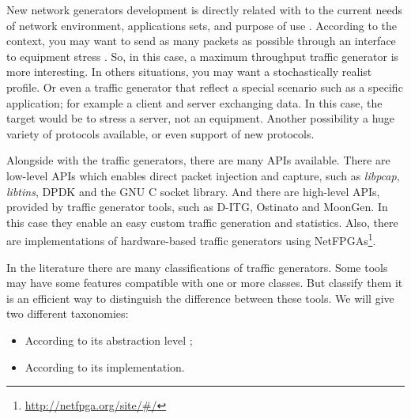 
New network generators development is directly related with to the current needs of network environment, applications sets, and purpose of use \cite{validate-trafficgen}. According to the context, you may want to send as many packets as possible through an interface to  equipment stress . So, in this case, a maximum throughput traffic generator is more interesting. In others situations, you may want a stochastically realist profile. Or even a traffic generator that reflect a special scenario such as a specific application; for example a client and server exchanging data\cite{surge-paper}. In this case, the target would be to stress a server, not an equipment. Another possibility a huge variety of protocols available, or even support of new protocols.

Alongside with the traffic generators, there are many APIs available. There are low-level APIs which enables direct packet injection and capture, such as \textit{libpcap}\cite{web-tcpdump}, \textit{libtins}\cite{web-libtins}, DPDK\cite{web-dpdk} and the GNU C socket library\cite{web-socket}. And there are high-level APIs, provided by traffic generator tools, such as D-ITG\cite{ditg-paper}, Ostinato\cite{web-ostinato} and MoonGen\cite{moongen-paper}. In this case they enable an easy custom traffic generation and statistics. Also, there are implementations of hardware-based traffic generators using NetFPGAs\footnote{\href{http://netfpga.org/site/\#/}{http://netfpga.org/site/\#/}}.

In the literature there are many classifications of traffic generators\cite{sourcesonoff-paper}\cite{hybrid-traffic-gen}\cite{validate-trafficgen}\cite{do-you-trust}. Some tools may have some features compatible with one or more classes. But classify them it is an efficient way to distinguish the difference between these tools. We will give two different taxonomies:

\begin{itemize}
\item According to its abstraction level \cite{do-you-trust};
\item According to its implementation.
\end{itemize}


